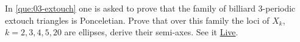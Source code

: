 \begin{question}
In \cref{que:03-extouch} one is asked to prove that the family of billiard 3-periodic extouch triangles is Ponceletian. Prove that over this family the loci of $X_k$, $k=2,3,4,5,20$ are ellipses, derive their semi-axes. See it \href{https://bit.ly/2RdtlvH}{Live}.
\end{question}